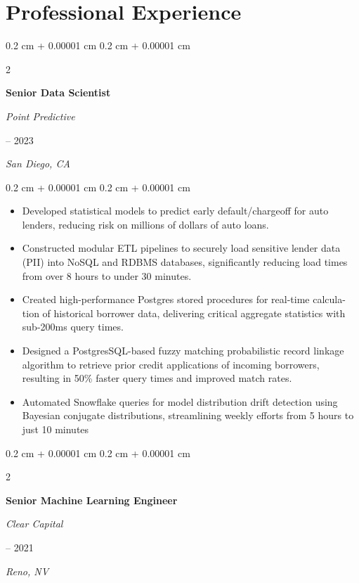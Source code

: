 \documentclass[11pt, letterpaper]{article}
\newenvironment{highlights}{
    \begin{itemize}[
        topsep=0.10 cm,
        parsep=0.10 cm,
        partopsep=0pt,
        itemsep=0pt,
        leftmargin=0.4 cm + 10pt
    ]
}{
    \end{itemize}
} %
\newenvironment{onecolentry}{
    \begin{adjustwidth}{
        0.2 cm + 0.00001 cm
    }{
        0.2 cm + 0.00001 cm
    }
}{
    \end{adjustwidth}
} %
\newenvironment{twocolentry}[2][]{
    \onecolentry
    \def\secondColumn{#2}
    \setcolumnwidth{\fill, 4.5 cm}
    \begin{paracol}{2}
}{
    \switchcolumn \raggedleft \secondColumn
    \end{paracol}
    \endonecolentry
} %
\begin{document}
\section{Professional Experience}

\begin{twocolentry}{
        2021 – 2023

        \textit{San Diego, CA}
    }
    \textbf{Senior Data Scientist}

    \textit{Point Predictive}
\end{twocolentry}

\begin{onecolentry}
    \begin{highlights}
        \item Developed statistical models to predict early default/chargeoﬀ for auto lenders,
        reducing risk on millions of dollars of auto loans.
        \item Constructed modular ETL pipelines to securely load sensitive lender data (PII)
        into NoSQL and RDBMS databases, signiﬁcantly reducing load times from over 8
        hours to under 30 minutes.
        \item Created high-performance Postgres stored procedures for real-time calcula-
        tion of historical borrower data, delivering critical aggregate statistics with
        sub-200ms query times.
        \item Designed a PostgresSQL-based fuzzy matching probabilistic record linkage
        algorithm to retrieve prior credit applications of incoming borrowers, resulting
        in 50\% faster query times and improved match rates.
        \item Automated Snowﬂake queries for model distribution drift detection using Bayesian conjugate distributions,
        streamlining weekly eﬀorts from 5 hours to just 10 minutes
    \end{highlights}
\end{onecolentry}

\begin{twocolentry}{
        2020 – 2021

        \textit{Reno, NV}
    }
    \textbf{Senior Machine Learning Engineer}

    \textit{Clear Capital}
\end{twocolentry}
\end{document}
